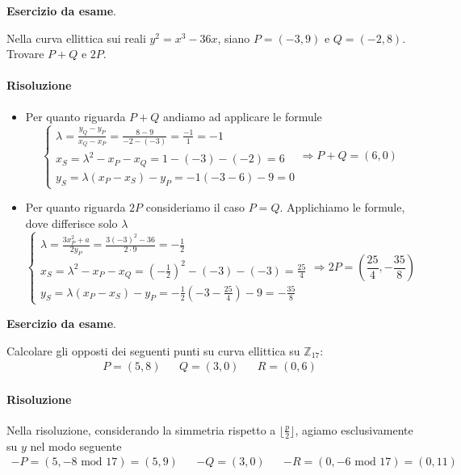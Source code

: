 \begin{framed}
	\noindent \textbf{Esercizio da esame}.
	
	\noindent Nella curva ellittica sui reali $y^2=x^3-36x$, siano $P = (-3, 9)$ e $Q = (-2, 8)$.\\Trovare $P + Q$ e $2P$.
	
	\paragraph{Risoluzione} 
	\begin{itemize}
		\item Per quanto riguarda $P+Q$ andiamo ad applicare le formule
		\[\begin{cases}
			\lambda=\frac{y_Q-y_P}{x_Q-x_P}=\frac{8-9}{-2-(-3)}=\frac{-1}{1}=-1\\
			x_S=\lambda^2-x_P-x_Q=1-(-3)-(-2)=6\\
			y_S=\lambda(x_P-x_S)-y_P=-1(-3-6)-9=0
		\end{cases}
	\Longrightarrow 
	P+Q=(6,0)\]
	\item Per quanto riguarda $2P$ consideriamo il caso $P=Q$. Applichiamo le formule, dove differisce solo $\lambda$
	\[\begin{cases}
		\lambda=\frac{3x_P^2+a}{2y_P}=\frac{3  (-3)^2-36}{2\cdot 9}=-\frac{1}{2}\\
		x_S=\lambda^2-x_P-x_Q=\left(-\frac{1}{2}\right)^2-(-3)-(-3)=\frac{25}{4}\\
		y_S=\lambda(x_P-x_S)-y_P=-\frac{1}{2}(-3-\frac{25}{4})-9=-\frac{35}{8}
	\end{cases}
	\Longrightarrow 
	2P=\left(\frac{25}{4},-\frac{35}{8}\right)\]
	
	\end{itemize}
\end{framed} 

\begin{framed}
	\noindent \textbf{Esercizio da esame}.
	
	\noindent Calcolare gli opposti dei seguenti punti su curva ellittica su $\mathbb{Z}_{17}$: 
	\begin{align*}P = (5, 8)&& Q = (3, 0)&& R = (0, 6)\end{align*}
	
	\paragraph{Risoluzione} Nella risoluzione, considerando la simmetria rispetto a $\lfloor \frac{p}{2} \rfloor$, agiamo esclusivamente su $y$ nel modo seguente
	\begin{align*}-P = (5, -8 \text{ mod } 17)=(5, 9)&& -Q = (3, 0)&& -R = (0, -6 \text{ mod } 17)=(0, 11)\end{align*}
\end{framed} 


